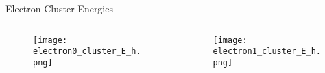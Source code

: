 \documentclass[aspectratio=169]{beamer}
\begin{document}
\begin{frame}{Electron Cluster Energies}
  \begin{columns}
    \begin{column}{0.5\textwidth}
      \begin{figure}
        \centering
        \texttt{[image: electron0\_cluster\_E\_h.png]}
      \end{figure}
    \end{column}
    \begin{column}{0.5\textwidth}
      \begin{figure}
        \centering
        \texttt{[image: electron1\_cluster\_E\_h.png]}
      \end{figure}
    \end{column}
  \end{columns}
\end{frame}
\end{document}
